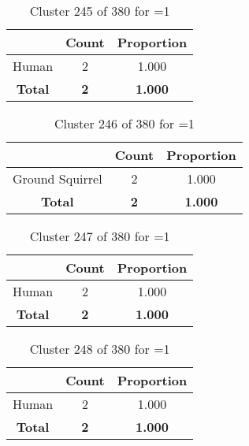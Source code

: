 \begin{table}[ht!]
\centering
\begin{tabular}{|c|c|c|}
\hline
\bf \Spec{} &\bf Count &\bf Proportion\\ \hline \hline
Human & 2 & 1.000\\ \hline
\hline
\bf Total & \bf 2 & \bf 1.000\\ \hline
\end{tabular}
\label{tab:cluster:245:1}
\caption{Cluster 245 of 380 for \minneigh{}=1}
\end{table}

\begin{table}[ht!]
\centering
\begin{tabular}{|c|c|c|}
\hline
\bf \Spec{} &\bf Count &\bf Proportion\\ \hline \hline
Ground Squirrel & 2 & 1.000\\ \hline
\hline
\bf Total & \bf 2 & \bf 1.000\\ \hline
\end{tabular}
\label{tab:cluster:246:1}
\caption{Cluster 246 of 380 for \minneigh{}=1}
\end{table}

\begin{table}[ht!]
\centering
\begin{tabular}{|c|c|c|}
\hline
\bf \Spec{} &\bf Count &\bf Proportion\\ \hline \hline
Human & 2 & 1.000\\ \hline
\hline
\bf Total & \bf 2 & \bf 1.000\\ \hline
\end{tabular}
\label{tab:cluster:247:1}
\caption{Cluster 247 of 380 for \minneigh{}=1}
\end{table}

\begin{table}[ht!]
\centering
\begin{tabular}{|c|c|c|}
\hline
\bf \Spec{} &\bf Count &\bf Proportion\\ \hline \hline
Human & 2 & 1.000\\ \hline
\hline
\bf Total & \bf 2 & \bf 1.000\\ \hline
\end{tabular}
\label{tab:cluster:248:1}
\caption{Cluster 248 of 380 for \minneigh{}=1}
\end{table}

